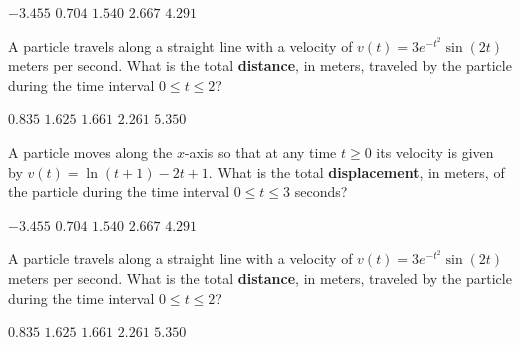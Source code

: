 \begin{questions}
    \begin{oneparchoices}
        \choice $-3.455$
        \choice $0.704$
        \choice $1.540$
        \choice $2.667$
        \choice $4.291$
    \end{oneparchoices} \par \horizontalline

    \question A particle travels along a straight line with a velocity of $v(t) = 3e^{-t^2}\sin (2t)$ meters per second. What is the total \textbf{distance}, in meters, traveled by the particle during the time interval $0 \leq t \leq 2$?

    \begin{oneparchoices}
        \choice $0.835$
        \choice $1.625$
        \choice $1.661$
        \choice $2.261$
        \choice $5.350$
    \end{oneparchoices} \par \horizontalline 

    \question A particle moves along the $x$-axis so that at any time $t \geq 0$ its velocity is given by $v(t) = \ln (t + 1) - 2t + 1$. What is the total \textbf{displacement}, in meters, of the particle during the time interval $0 \leq t \leq 3$ seconds?  \\

    \begin{oneparchoices}
        \choice $-3.455$
        \choice $0.704$
        \choice $1.540$
        \choice $2.667$
        \choice $4.291$
    \end{oneparchoices} \par \horizontalline

    \question A particle travels along a straight line with a velocity of $v(t) = 3e^{-t^2}\sin (2t)$ meters per second. What is the total \textbf{distance}, in meters, traveled by the particle during the time interval $0 \leq t \leq 2$?

    \begin{oneparchoices}
        \choice $0.835$
        \choice $1.625$
        \choice $1.661$
        \choice $2.261$
        \choice $5.350$
    \end{oneparchoices} \par \horizontalline 
\end{questions}
